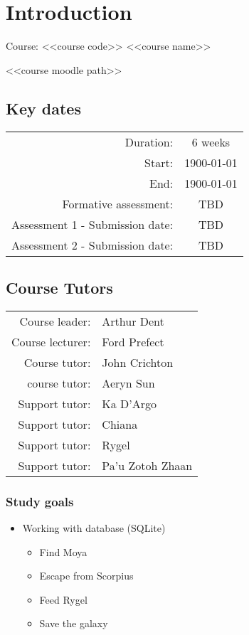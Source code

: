 \section{Introduction}

{\huge{Course: <<course code>> <<course name>>}}

<<course moodle path>>

\subsection{Key dates}

\begin{tabular}{r @{} c}
    Duration: & 6 weeks\\
    Start: & 1900-01-01\\
    End: & 1900-01-01\\
    Formative assessment: & TBD\\
    Assessment 1 - Submission date: & TBD\\
    Assessment 2 - Submission date: & TBD\\
\end{tabular}

\subsection{Course Tutors}

\begin{tabular}{r @{} l}
    Course leader: & Arthur Dent\\
    Course lecturer: & Ford Prefect\\
    Course tutor: & John Crichton\\
    course tutor: & Aeryn Sun\\
    Support tutor: & Ka D'Argo\\
    Support tutor: & Chiana\\
    Support tutor: & Rygel\\
    Support tutor: & Pa'u Zotoh Zhaan\\
\end{tabular}

\subsubsection{Study goals}

\begin{itemize}
    \item Working with database (SQLite)
        \begin{itemize}
            \item Find Moya
            \item Escape from Scorpius
            \item Feed Rygel
            \item Save the galaxy
        \end{itemize}
\end{itemize}